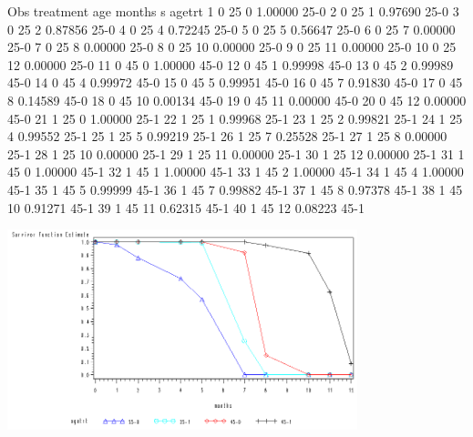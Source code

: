 \documentclass{article}
\begin{document}
\begin{Woutput}
Obs    treatment    age    months       s       agetrt
  1        0         25       0      1.00000     25-0
  2        0         25       1      0.97690     25-0
  3        0         25       2      0.87856     25-0
  4        0         25       4      0.72245     25-0
  5        0         25       5      0.56647     25-0
  6        0         25       7      0.00000     25-0
  7        0         25       8      0.00000     25-0
  8        0         25      10      0.00000     25-0
  9        0         25      11      0.00000     25-0
 10        0         25      12      0.00000     25-0
 11        0         45       0      1.00000     45-0
 12        0         45       1      0.99998     45-0
 13        0         45       2      0.99989     45-0
 14        0         45       4      0.99972     45-0
 15        0         45       5      0.99951     45-0
 16        0         45       7      0.91830     45-0
 17        0         45       8      0.14589     45-0
 18        0         45      10      0.00134     45-0
 19        0         45      11      0.00000     45-0
 20        0         45      12      0.00000     45-0
 21        1         25       0      1.00000     25-1
 22        1         25       1      0.99968     25-1
 23        1         25       2      0.99821     25-1
 24        1         25       4      0.99552     25-1
 25        1         25       5      0.99219     25-1
 26        1         25       7      0.25528     25-1
 27        1         25       8      0.00000     25-1
 28        1         25      10      0.00000     25-1
 29        1         25      11      0.00000     25-1
 30        1         25      12      0.00000     25-1
 31        1         45       0      1.00000     45-1
 32        1         45       1      1.00000     45-1
 33        1         45       2      1.00000     45-1
 34        1         45       4      1.00000     45-1
 35        1         45       5      0.99999     45-1
 36        1         45       7      0.99882     45-1
 37        1         45       8      0.97378     45-1
 38        1         45      10      0.91271     45-1
 39        1         45      11      0.62315     45-1
 40        1         45      12      0.08223     45-1
\end{Woutput}
\includegraphics[width=4in]{survival-curves}
\end{document}
